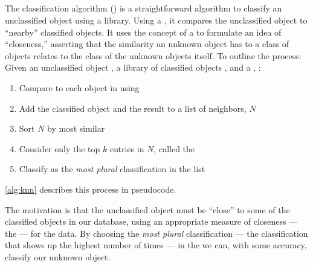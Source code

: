 \subsection{\kNNlong{}}\label{sec:knn}
The \kNNlong{} classification algorithm (\kNN{}) is a straightforward algorithm to classify an unclassified object using a library. 
Using a \compfunc{}, it compares the unclassified object to ``nearby'' classified objects.
It uses the concept of a \compfunc{} to formulate an idea of ``closeness,'' asserting that the similarity an unknown object has to a class of objects relates to the class of the unknown objects itself.
To outline the process:
Given an unclassified object \UNKNOWN{}, a library of classified objects \LIB{}, and a \compfunc{}, \COMP{}:
\begin{enumerate}
\item Compare \UNKNOWN{} to each object in \LIB{} using \COMP{}
\item Add the classified object and the result to a list of neighbors, $N$
\item Sort $N$ by most similar
\item Consider only the top $k$ entries in $N$, called the \knnlong{} \label{knn:filter}
\item Classify \UNKNOWN{} as the \textit{most plural} classification in the \knnlong{} list
\end{enumerate}
\autoref{alg:knn} describes this process in pseudocode.


The motivation is that the unclassified object must be ``close'' to some of the classified objects in our database, using an appropriate measure of closeness --- the \textit{\compfunc{}} --- for the data. 
\index{\compfunc{}}
By choosing the \textit{most plural} classification --- the classification that shows up the highest number of times ---  in the \knnlong{} we can, with some accuracy, classify our unknown object.

